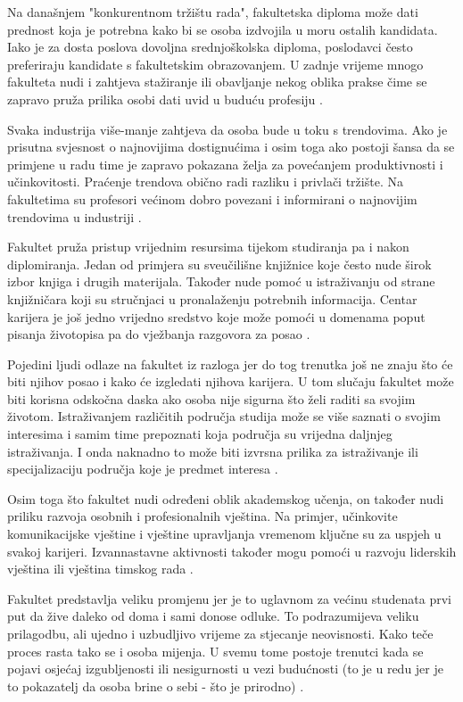 \documentclass[]{foi}
\begin{document}
Na današnjem "konkurentnom tržištu rada", fakultetska diploma može dati prednost koja je potrebna kako bi se osoba izdvojila u moru ostalih kandidata. Iako je za dosta poslova dovoljna
srednjoškolska diploma, poslodavci često preferiraju kandidate s fakultetskim obrazovanjem. U zadnje vrijeme mnogo fakulteta nudi i zahtjeva stažiranje ili obavljanje nekog oblika prakse čime
se zapravo pruža prilika osobi dati uvid u buduću profesiju \cite{bisio2025college}. 

Svaka industrija više-manje zahtjeva da osoba bude u toku s trendovima. Ako je prisutna svjesnost o najnovijima dostignućima i osim toga ako postoji šansa da se primjene u radu time je zapravo 
pokazana želja za povećanjem produktivnosti i učinkovitosti. Praćenje trendova obično radi razliku i privlači tržište. Na fakultetima su profesori većinom dobro povezani i informirani
o najnovijim trendovima u industriji \cite{bisio2025college}.

Fakultet pruža pristup vrijednim resursima tijekom studiranja pa i nakon diplomiranja. Jedan od primjera su sveučilišne knjižnice koje često nude širok izbor knjiga i drugih materijala.
Također nude pomoć u istraživanju od strane knjižničara koji su stručnjaci u pronalaženju potrebnih informacija. Centar karijera je još jedno vrijedno sredstvo koje može pomoći u domenama
poput pisanja životopisa pa do vježbanja razgovora za posao \cite{bisio2025college}. 

Pojedini ljudi odlaze na fakultet iz razloga jer do tog trenutka još ne znaju što će biti njihov posao i kako će izgledati njihova karijera. U tom slučaju fakultet može biti korisna odskočna
daska ako osoba nije sigurna što želi raditi sa svojim životom. Istraživanjem različitih područja studija može se više saznati o svojim interesima i samim time prepoznati koja područja su vrijedna
daljnjeg istraživanja. I onda naknadno to može biti izvrsna prilika za istraživanje ili specijalizaciju područja koje je predmet interesa \cite{bisio2025college}.

Osim toga što fakultet nudi određeni oblik akademskog učenja, on također nudi priliku razvoja osobnih i profesionalnih vještina. Na primjer, učinkovite komunikacijske vještine i vještine upravljanja 
vremenom ključne su za uspjeh u svakoj karijeri. Izvannastavne aktivnosti također mogu pomoći u razvoju liderskih vještina ili vještina timskog rada \cite{bisio2025college}.

Fakultet predstavlja veliku promjenu jer je to uglavnom za većinu studenata prvi put da žive daleko od doma i sami donose odluke. To podrazumijeva veliku prilagodbu, ali ujedno i uzbudljivo vrijeme
za stjecanje neovisnosti. Kako teče proces rasta tako se i osoba mijenja. U svemu tome postoje trenutci kada se pojavi osjećaj izgubljenosti ili nesigurnosti u vezi budućnosti (to je u redu 
jer je to pokazatelj da osoba brine o sebi - što je prirodno) \cite{bisio2025college}. 
\end{document}
